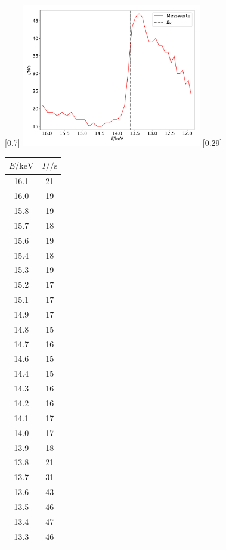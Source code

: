 \begin{figure}
  \centering
  [0.7\textwidth]{
  \includegraphics[width=0.7\textwidth]{brom.pdf}
  }
  \hfill
  [0.29\textwidth]{
  \begin{tabular}{c c}
    \toprule
    $E / \si{\kilo\electronvolt}$ & $I / \si{\per\second}$ \\
    \midrule
    16.1 & 21 \\
    16.0 & 19 \\
    15.8 & 19 \\
    15.7 & 18 \\
    15.6 & 19 \\
    15.4 & 18 \\
    15.3 & 19 \\
    15.2 & 17 \\
    15.1 & 17 \\
    14.9 & 17 \\
    14.8 & 15 \\
    14.7 & 16 \\
    14.6 & 15 \\
    14.4 & 15 \\
    14.3 & 16 \\
    14.2 & 16 \\
    14.1 & 17 \\
    14.0 & 17 \\
    13.9 & 18 \\
    13.8 & 21 \\
    13.7 & 31 \\
    13.6 & 43 \\
    13.5 & 46 \\
    13.4 & 47 \\
    13.3 & 46 \\

\end{tabular}}
\end{figure}
